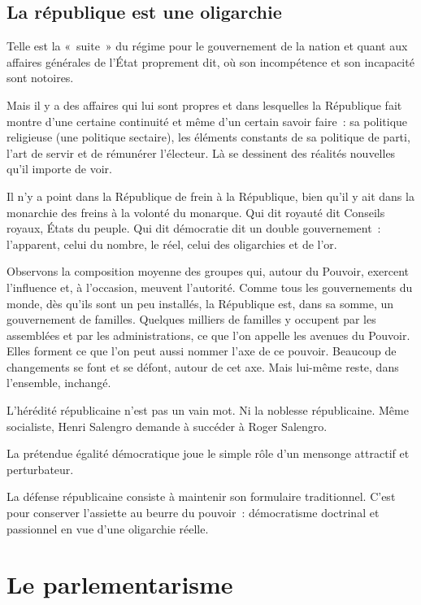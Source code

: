 \documentclass[french,twoside]{book} %
\begin{document}
\subsection[{La république est une oligarchie}]{La république est une oligarchie}
\noindent Telle est la « suite » du régime pour le gouvernement de la nation et quant aux affaires générales de l’État proprement dit, où son incompétence et son incapacité sont notoires.\par
Mais il y a des affaires qui lui sont propres et dans lesquelles la République fait montre d’une certaine continuité et même d’un certain savoir faire : sa politique religieuse (une politique sectaire), les éléments constants de sa politique de parti, l’art de servir et de rémunérer l’électeur. Là se dessinent des réalités nouvelles qu’il importe de voir.\par
Il n’y a point dans la République de frein à la République, bien qu’il y ait dans la monarchie des freins à la volonté du monarque. Qui dit royauté dit Conseils royaux, États du peuple. Qui dit démocratie dit un double gouvernement : l’apparent, celui du nombre, le réel, celui des oligarchies et de l’or.\par
Observons la composition moyenne des groupes qui, autour du Pouvoir, exercent l’influence et, à l’occasion, meuvent l’autorité. Comme tous les gouvernements du monde, dès qu’ils sont un peu installés, la République est, dans sa somme, un gouvernement de familles. Quelques milliers de familles y occupent par les assemblées et par les administrations, ce que l’on appelle les avenues du Pouvoir. Elles forment ce que l’on peut aussi nommer l’axe de ce pouvoir. Beaucoup de changements se font et se défont, autour de cet axe. Mais lui-même reste, dans l’ensemble, inchangé.\par
L’hérédité républicaine n’est pas un vain mot. Ni la noblesse républicaine. Même socialiste, Henri Salengro demande à succéder à Roger Salengro.\par
La prétendue égalité démocratique joue le simple rôle d’un mensonge attractif et perturbateur.\par
La défense républicaine consiste à maintenir son formulaire traditionnel. C’est pour conserver l’assiette au beurre du pouvoir : démocratisme doctrinal et passionnel en vue d’une oligarchie réelle.
\section[{Le parlementarisme}]{Le parlementarisme}
\end{document}
